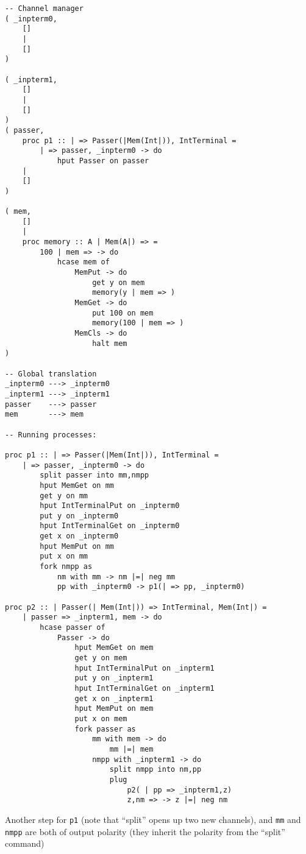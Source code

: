 \documentclass{article}
\theoremstyle{plain}%
\theoremstyle{definition}
\theoremstyle{remark}
\begin{document}
\begin{verbatim}
-- Channel manager
( _inpterm0,  
    []
    |
    []
)

( _inpterm1,  
    []
    |
    []
)
( passer,
    proc p1 :: | => Passer(|Mem(Int|)), IntTerminal = 
        | => passer, _inpterm0 -> do
            hput Passer on passer
    |
    []
)

( mem,
    []
    |
    proc memory :: A | Mem(A|) => =
        100 | mem => -> do
            hcase mem of
                MemPut -> do
                    get y on mem
                    memory(y | mem => )
                MemGet -> do
                    put 100 on mem
                    memory(100 | mem => )
                MemCls -> do
                    halt mem
)

-- Global translation
_inpterm0 ---> _inpterm0 
_inpterm1 ---> _inpterm1 
passer    ---> passer 
mem       ---> mem

-- Running processes:

proc p1 :: | => Passer(|Mem(Int|)), IntTerminal = 
    | => passer, _inpterm0 -> do
        split passer into mm,nmpp
        hput MemGet on mm 
        get y on mm
        hput IntTerminalPut on _inpterm0
        put y on _inpterm0
        hput IntTerminalGet on _inpterm0
        get x on _inpterm0
        hput MemPut on mm
        put x on mm
        fork nmpp as
            nm with mm -> nm |=| neg mm
            pp with _inpterm0 -> p1(| => pp, _inpterm0)

proc p2 :: | Passer(| Mem(Int|)) => IntTerminal, Mem(Int|) =
    | passer => _inpterm1, mem -> do
        hcase passer of
            Passer -> do
                hput MemGet on mem
                get y on mem
                hput IntTerminalPut on _inpterm1
                put y on _inpterm1
                hput IntTerminalGet on _inpterm1
                get x on _inpterm1
                hput MemPut on mem
                put x on mem
                fork passer as
                    mm with mem -> do
                        mm |=| mem
                    nmpp with _inpterm1 -> do
                        split nmpp into nm,pp
                        plug
                            p2( | pp => _inpterm1,z)
                            z,nm => -> z |=| neg nm

\end{verbatim}
Another step for \verb|p1| (note that ``split'' opens up two new channels),
    and \verb|mm| and \verb|nmpp| are both of output polarity 
    (they inherit the polarity from the ``split'' command)
\end{document}
